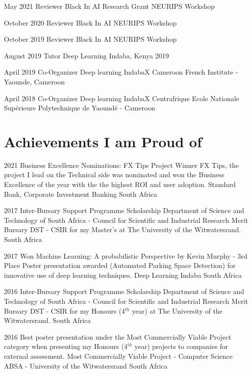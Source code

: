 \documentclass[letterpaper]{moderncv}        %
\begin{document}
\cventry
{May 2021}
{Reviewer Black In AI Research Grant}
{NEURIPS Workshop}
{}
{}
{}

\cventry
{October 2020}
{Reviewer Black In AI}
{NEURIPS Workshop}
{}
{}
{}

\cventry
{October 2019}
{Reviewer Black In AI}
{NEURIPS Workshop}
{}
{}
{}

\cventry
{August 2019}
{Tutor}
{Deep Learning Indaba, Kenya 2019}
{}
{}
{}

\cventry
{April 2019}
{Co-Organizer Deep learning IndabaX Cameroon}
{French Institute - Yaounde, Cameroon}
{}
{}
{}


\cventry
{April 2018}
{Co-Organizer Deep learning IndabaX Centrafrique}
{Ecole Nationale Supérieure Polytechnique de Yaoundé - Cameroon}
{}
{}
{}


\section{Achievements I am Proud of}

\cventry
{2021}
{Business Excellence Nominations: FX Tips Project Winner}
{FX Tips, the project I lead on the Technical side was nominated and won the Business Excellence of the year with the the highest ROI and user adoption.}
{Standard Bank, Corporate Investment Banking}
{South Africa}
{}

\cventry
{2017}
{Inter-Bursary Support Programme Scholarship}
{Department of Science and Technology of South Africa - Council for Scientific and Industrial Research Merit Bursary}
{DST - CSIR for my Master's at The University of the Witwatersrand.}
{South Africa}
{}

\cventry
{2017}
{Won Machine Learning: A probabilistic Perspective by Kevin Murphy - 3rd Place}
{Poster presentation awarded (Automated Parking Space Detection) for innovative use of deep learning techniques.}
{Deep Learning Indaba}
{South Africa}
{}

\cventry
{2016}
{Inter-Bursary Support Programme Scholarship}
{Department of Science and Technology of South Africa - Council for Scientific and Industrial Research Merit Bursary}
{DST - CSIR for my Honours (4$^{th}$ year) at The University of the Witwatersrand.}
{South Africa}
{}


\cventry
{2016}
{Best poster presentation under the Most Commercially Viable Project category when presenting my Honours (4$^{th}$ year) projects to companies for external assessment.}
{Most Commercially Viable Project - Computer Science}
{ABSA - University of the Witwatersrand}
{South Africa}
{}
\end{document}
